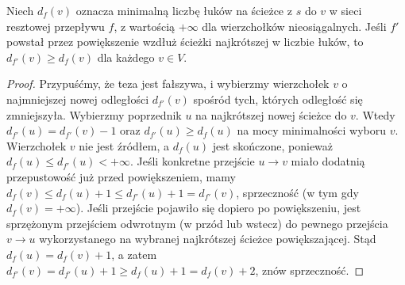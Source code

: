 \begin{lemat}
\label{lem:tg-flow-ek-levels}
Niech $d_f(v)$ oznacza minimalną liczbę łuków
na ścieżce z $s$ do $v$ w sieci resztowej
przepływu $f$, z wartością $+\infty$ dla
wierzchołków nieosiągalnych.
Jeśli $f'$ powstał przez powiększenie
wzdłuż ścieżki najkrótszej w liczbie łuków,
to $d_{f'}(v)\geq d_f(v)$ dla każdego $v\in V$.
\end{lemat}
\begin{proof}
Przypuśćmy, że teza jest fałszywa,
i wybierzmy wierzchołek $v$ o najmniejszej
nowej odległości $d_{f'}(v)$ spośród tych,
których odległość się zmniejszyła.
Wybierzmy poprzednik $u$ na najkrótszej
nowej ścieżce do $v$. Wtedy
$d_{f'}(u)=d_{f'}(v)-1$ oraz
$d_{f'}(u)\geq d_f(u)$ na mocy
minimalności wyboru $v$.
Wierzchołek $v$ nie jest źródłem, a $d_f(u)$
jest skończone, ponieważ $d_f(u)\leq d_{f'}(u)<+\infty$.
Jeśli konkretne przejście $u\to v$ miało dodatnią
przepustowość już przed powiększeniem,
mamy $d_f(v)\leq d_f(u)+1
\leq d_{f'}(u)+1=d_{f'}(v)$,
sprzeczność (w tym gdy $d_f(v)=+\infty$).
Jeśli przejście pojawiło się dopiero
po powiększeniu, jest sprzężonym przejściem
odwrotnym (w przód lub wstecz)
do pewnego przejścia $v\to u$
wykorzystanego na wybranej najkrótszej
ścieżce powiększającej. Stąd
$d_f(u)=d_f(v)+1$, a zatem
$d_{f'}(v)=d_{f'}(u)+1
\geq d_f(u)+1=d_f(v)+2$,
znów sprzeczność.
\end{proof}

